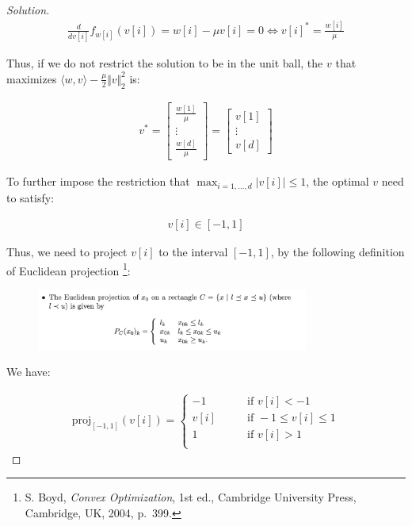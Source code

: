 \documentclass{article}
\newenvironment{solution}
  {\renewcommand\qedsymbol{$\blacksquare$}\begin{proof}[Solution]}
  {\end{proof}}
\begin{document}
\begin{solution}
    \begin{align*}
        \frac{d}{dv[i]} f_{w[i]}(v[i]) = w[i] - \mu v[i] = 0 \iff v[i]^* = \frac{w[i]}{\mu}
    \end{align*}

    Thus, if we do not restrict the solution to be in the unit ball, 
    the $v$ that maximizes $\langle w, v \rangle - \frac{\mu}{2} \Vert v \Vert^2_2$ is:

    \begin{align*}
        v^* 
        = \begin{bmatrix}
            \frac{w[1]}{\mu} \\
            \vdots \\
            \frac{w[d]}{\mu}
        \end{bmatrix}
        = \begin{bmatrix}
            v[1] \\
            \vdots \\
            v[d]
        \end{bmatrix}
    \end{align*}

    To further impose the restriction that $\max_{i = 1, \dots, d} \vert v[i] \vert \leq 1$, 
    the optimal $v$ need to satisfy:

    \begin{align*}
        v[i] \in [-1, 1]
    \end{align*}

    Thus, we need to project $v[i]$ to the interval $[-1, 1]$, 
    by the following definition of Euclidean projection
    \footnote{S. Boyd, \textit{Convex Optimization}, 1st ed., Cambridge University Press, Cambridge, UK, 2004, p.~399.}:

    \begin{figure}[H]
        \centering
        \includegraphics[width = 0.8\textwidth]{euclidean_projection.png}
    \end{figure}

    We have:

    \begin{align*}
        \text{proj}_{[-1, 1]}(v[i]) = \begin{cases}
            -1 \qquad &\text{if } v[i] < -1 \\
            v[i] \qquad &\text{if } -1 \leq v[i] \leq 1 \\
            1 \qquad &\text{if } v[i] > 1 \\
        \end{cases}
    \end{align*}


\end{solution}
\end{document}
